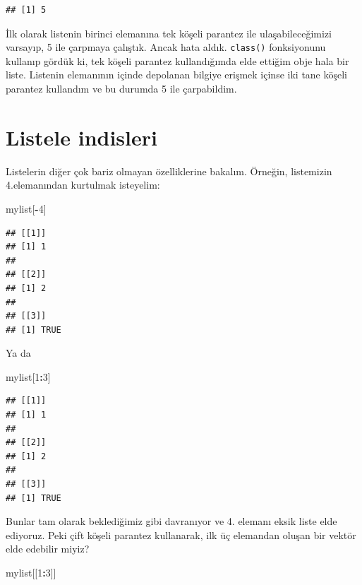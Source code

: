 \documentclass[]{book}
\newenvironment{Shaded}{\begin{snugshade}}{\end{snugshade}}
\newcommand{\DecValTok}[1]{\textcolor[rgb]{0.00,0.00,0.81}{#1}}
\newcommand{\NormalTok}[1]{#1}
\newcommand{\OperatorTok}[1]{\textcolor[rgb]{0.81,0.36,0.00}{\textbf{#1}}}
\begin{document}
\begin{verbatim}
## [1] 5
\end{verbatim}

İlk olarak listenin birinci elemanına tek köşeli parantez ile
ulaşabileceğimizi varsayıp, 5 ile çarpmaya çalıştık. Ancak hata aldık.
\texttt{class()} fonksiyonunu kullanıp gördük ki, tek köşeli parantez
kullandığımda elde ettiğim obje hala bir liste. Listenin elemanının
içinde depolanan bilgiye erişmek içinse iki tane köşeli parantez
kullandım ve bu durumda 5 ile çarpabildim.

\hypertarget{listele-indisleri}{%
\section{Listele indisleri}\label{listele-indisleri}}

Listelerin diğer çok bariz olmayan özelliklerine bakalım. Örneğin,
listemizin 4.elemanından kurtulmak isteyelim:

\begin{Shaded}
\begin{Highlighting}[]
\NormalTok{mylist[}\OperatorTok{-}\DecValTok{4}\NormalTok{]}
\end{Highlighting}
\end{Shaded}

\begin{verbatim}
## [[1]]
## [1] 1
## 
## [[2]]
## [1] 2
## 
## [[3]]
## [1] TRUE
\end{verbatim}

Ya da

\begin{Shaded}
\begin{Highlighting}[]
\NormalTok{mylist[}\DecValTok{1}\OperatorTok{:}\DecValTok{3}\NormalTok{]}
\end{Highlighting}
\end{Shaded}

\begin{verbatim}
## [[1]]
## [1] 1
## 
## [[2]]
## [1] 2
## 
## [[3]]
## [1] TRUE
\end{verbatim}

Bunlar tam olarak beklediğimiz gibi davranıyor ve 4. elemanı eksik liste
elde ediyoruz. Peki çift köşeli parantez kullanarak, ilk üç elemandan
oluşan bir vektör elde edebilir miyiz?

\begin{Shaded}
\begin{Highlighting}[]
\NormalTok{mylist[[}\DecValTok{1}\OperatorTok{:}\DecValTok{3}\NormalTok{]]}
\end{Highlighting}
\end{Shaded}
\end{document}
